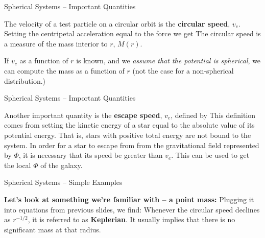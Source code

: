 \documentclass[letterpaper,landscape]{slides}
\begin{document}



\begin{slide}
\begin{center}
{\large \color{red} 
                      Spherical Systems -- Important Quantities}
\end{center}

The velocity of a test particle on a circular orbit is the {\bf circular speed}, $v_c$.  
Setting the centripetal acceleration equal to the force we get
The circular speed is a measure of the mass interior to $r$, $M(r)$.

If $v_c$ as a function of $r$ is known, and we {\it assume that the
potential is spherical}, we can compute the mass as a function of $r$
(not the case for a non-spherical distribution.)

\vfill
\end{slide}

\begin{slide}
\begin{center}
{\large \color{red} 
                      Spherical Systems -- Important Quantities}
\end{center}

Another important quantity is the {\bf escape speed}, $v_e$, defined by
This definition comes from setting the kinetic energy of a star equal
to the absolute value of its potential energy.  That is, stars with
positive total energy are not bound to the system.
In order for a star to escape from from the gravitational field
represented by $\Phi$, it is necessary that its speed be greater than
$v_e$.  This can be used to get the local $\Phi$ of the galaxy.

\vfill
\end{slide}


\begin{slide}
\begin{center}
{\large \color{red} 
                      Spherical Systems -- Simple Examples}
\end{center}

{\bf Let's look at something we're familiar with -- a point mass:}
Plugging it into equations from previous slides, we find:
Whenever the circular speed declines as $r^{-1/2}$, it is referred to as
{\bf \color{red} Keplerian}.  It usually implies that there is no significant mass
at that radius.

\vfill
\end{slide}
\end{document}
